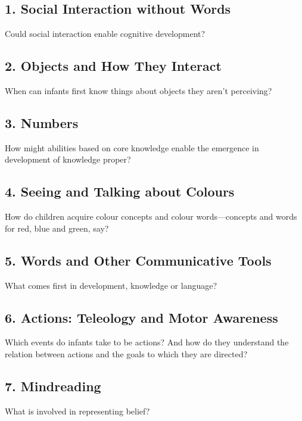 \documentclass[12pt]{extarticle}
\begin{document}
\begin{multicols}{3}
\subsection{1. Social Interaction without Words}
Could social interaction enable cognitive development? 
\citep{Moll:2007gu,
meltzoff:1977_imitation,
Csibra:2008be,
Baldwin:2000qq,
Liszkowski:2008al,
tomasello:2008origins}


\subsection{2. Objects and How They Interact}
\label{ch:objects}
When can infants first know things about objects they aren't perceiving?\citep{Meltzoff:1998wp,
baillargeon:1985_object,
Fodor:1983dg}



\subsection{3. Numbers}

How might abilities based on core knowledge enable the emergence in development of knowledge proper?\citep{
xu:2000_large,
wynn:1992_addition,
Fodor:1981ep,
carey:2009_origin}



\subsection{4. Seeing and Talking about Colours}
How do children acquire colour concepts and colour words---concepts and words for red, blue and green, say?\citep{Soja:1994np,
franklin:2010_hemispheric,
Franklin:2005hp}



\subsection{5. Words and Other Communicative Tools}
What comes first in development, knowledge or language?\citep{Wittgenstein:1974dk,
Bloom:2000qz,
Senghas:2001zm,
Goldin-Meadow:2003pj} 




\subsection{6. Actions: Teleology and Motor Awareness}
Which events do infants take to be actions?
And how do they understand the relation between actions and the goals to which they are directed?\citep{Bratman:1987xw,Csibra:1998cx,
rizzolatti_functional_2010,
bekkering:2000_imitation}

\subsection{7. Mindreading}
What is involved in representing belief?\citep[]{Onishi:2005hm, Southgate:2007js,kovacs_social_2010,
Davidson:1990du}

 \setlength{\bibsep}{3pt}
\footnotesize 


\end{multicols}
\end{document}
